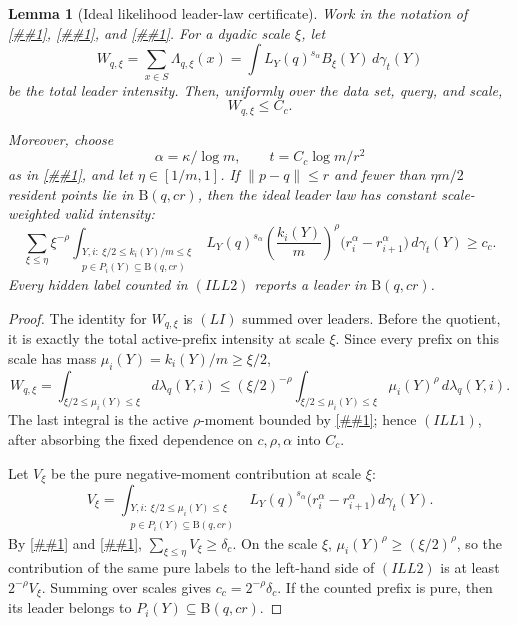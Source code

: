 \documentclass[10pt]{article}
\newcommand{\cref}[1]{\ref{##1}}
\newtheorem{lemma}[theorem]{Lemma}
\theoremstyle{definition}
\newcommand{\Ball}{\mathrm{B}}
\begin{document}
\begin{lemma}[Ideal likelihood leader-law certificate]
   \label{lem:ideal-likelihood-leader-law}
   Work in the notation of \cref{thm:continuous-likelihood-balls},
   \cref{lem:likelihood-rank-prefix}, and
   \cref{cor:likelihood-leader-intensity}.  For a dyadic scale \(\xi\), let
   \[
      W_{q,\xi}=\sum_{x\in S}\Lambda_{q,\xi}(x)
      =
      \int L_Y(q)^{s_\alpha}B_\xi(Y)\,d\gamma_t(Y)
   \]
   be the total leader intensity.  Then, uniformly over the data set, query,
   and scale,
   \[
      W_{q,\xi}\le C_c .
      \tag{ILL1}
   \]

   Moreover, choose
   \[
      \alpha=\kappa/\log m,
      \qquad
      t=C_c\log m/r^2
   \]
   as in \cref{thm:continuous-likelihood-balls}, and let
   \(\eta\in[1/m,1]\).  If \(\|p-q\|\le r\) and fewer than \(\eta m/2\)
   resident points lie in \(\Ball(q,cr)\), then the ideal leader law has
   constant scale-weighted valid intensity:
   \[
      \sum_{\xi\le\eta}\xi^{-\rho}
      \int_{\substack{Y,i:\ \xi/2\le k_i(Y)/m\le\xi\\
                      p\in P_i(Y)\subseteq\Ball(q,cr)}}
      L_Y(q)^{s_\alpha}
      \left(\frac{k_i(Y)}m\right)^\rho
      \bigl(r_i^\alpha-r_{i+1}^\alpha\bigr)\,d\gamma_t(Y)
      \ge c_c .
      \tag{ILL2}
   \]
   Every hidden label counted in \((ILL2)\) reports a leader in
   \(\Ball(q,cr)\).
\end{lemma}

\begin{proof}
   The identity for \(W_{q,\xi}\) is \((LI)\) summed over leaders.  Before the
   quotient, it is exactly the total active-prefix intensity at scale \(\xi\).
   Since every prefix on this scale has mass
   \(\mu_i(Y)=k_i(Y)/m\ge\xi/2\),
   \[
      W_{q,\xi}
      =
      \int_{\xi/2\le\mu_i(Y)\le\xi}d\lambda_q(Y,i)
      \le
      (\xi/2)^{-\rho}
      \int_{\xi/2\le\mu_i(Y)\le\xi}\mu_i(Y)^\rho\,d\lambda_q(Y,i).
   \]
   The last integral is the active \(\rho\)-moment bounded by
   \cref{lem:ideal-likelihood-scale-profile}; hence \((ILL1)\), after
   absorbing the fixed dependence on \(c,\rho,\alpha\) into \(C_c\).

   Let \(V_\xi\) be the pure negative-moment contribution at scale \(\xi\):
   \[
      V_\xi=
      \int_{\substack{Y,i:\ \xi/2\le\mu_i(Y)\le\xi\\
                      p\in P_i(Y)\subseteq\Ball(q,cr)}}
      L_Y(q)^{s_\alpha}
      \bigl(r_i^\alpha-r_{i+1}^\alpha\bigr)\,d\gamma_t(Y).
   \]
   By \cref{lem:ideal-likelihood-scale-profile} and
   \cref{thm:continuous-likelihood-balls},
   \(\sum_{\xi\le\eta}V_\xi\ge\delta_c\).  On the scale \(\xi\),
   \(\mu_i(Y)^\rho\ge(\xi/2)^\rho\), so the contribution of the same pure
   labels to the left-hand side of \((ILL2)\) is at least
   \(2^{-\rho}V_\xi\).  Summing over scales gives
   \(c_c=2^{-\rho}\delta_c\).  If the counted prefix is pure, then its leader
   belongs to \(P_i(Y)\subseteq\Ball(q,cr)\).
\end{proof}
\end{document}
